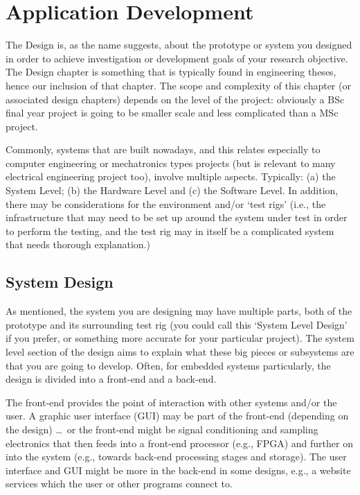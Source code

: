 
\glsresetall %
\chapter[Design]{Application Development}\label{ch:Design}

The Design is, as the name suggests, about the prototype or system you designed in order to achieve investigation or development goals of your research objective. The Design chapter is something that is typically found in engineering theses, hence our inclusion of that chapter. The scope and complexity of this chapter (or associated design chapters) depends on the level of the project: obviously a BSc final year project is going to be smaller scale and less complicated than a MSc project.

Commonly, systems that are built nowadays, and this relates especially to computer engineering or mechatronics types projects (but is relevant to many electrical engineering project too), involve multiple aspects.  Typically: (a) the System Level; (b) the Hardware Level and (c) the Software Level.  In addition, there may be considerations for the environment and/or `test rigs' (i.e., the infrastructure that may need to be set up around the system under test in order to perform the testing, and the test rig may in itself be a complicated system that needs thorough explanation.)

\section{System Design}
\label{sec:Design/SystemDesign}

As mentioned, the system you are designing may have multiple parts, both of the prototype and its surrounding test rig (you could call this `System Level Design' if you prefer, or something more accurate for your particular project).  The system level section of the design aims to explain what these big pieces or subsystems are that you are going to develop.  Often, for embedded systems particularly, the design is divided into a front-end and a back-end.

The front-end provides the point of interaction with other systems and/or the user.  A graphic user interface (GUI) may be part of the front-end (depending on the design) \ldots\ or the front-end might be signal conditioning and sampling electronics that then feeds into a front-end processor (e.g., FPGA) and further on into the system (e.g., towards back-end processing stages and storage). The user interface and GUI might be more in the back-end in some designs, e.g., a website services which the user or other programs connect to.

